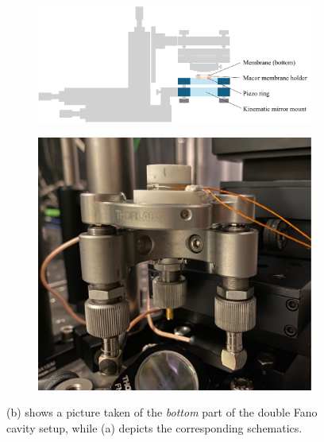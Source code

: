 \begin{figure}[h!]
    \centering
    \begin{subfigure}[b]{0.6\textwidth}
        \includegraphics[width=\textwidth]{figures/setup_bottom.pdf}
        \caption{}
        \label{fig:setup_bottom}
    \end{subfigure}
    \begin{subfigure}[b]{0.3\textwidth}
        \includegraphics[width=\textwidth]{figures/cavity_setup_bottom_pic.pdf}
        \caption{}
        \label{fig:setup_bottom_pic}
    \end{subfigure}
    \caption{(b) shows a picture taken of the \emph{bottom} part of the double Fano cavity setup, while (a) depicts the corresponding schematics.}
    \label{fig:setup_bottom_sketch_and_pic}
\end{figure}

